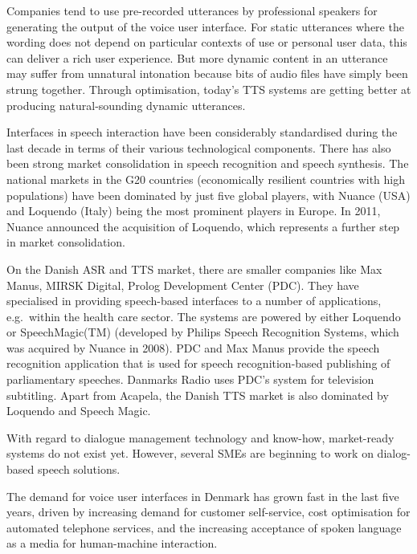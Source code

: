 \documentclass[]{../../metanetpaper}
\begin{document}
\begin{multicols}{2}

Companies tend to use pre-recorded utterances by professional speakers for generating the output of the voice user interface. For static utterances where the wording does not depend on particular contexts of use or personal user data, this can deliver a rich user experience. But more dynamic content in an utterance may suffer from unnatural intonation because bits of audio files have simply been strung together. Through optimisation, today’s TTS systems are getting better at producing natural-sounding dynamic utterances.

Interfaces in speech interaction have been considerably standardised during the last decade in terms of their various technological components. There has also been strong market consolidation in speech recognition and speech synthesis. The national markets in the G20 countries (economically resilient countries with high populations) have been dominated by just five global players, with Nuance (USA) and Loquendo (Italy) being the most prominent players in Europe. In 2011, Nuance announced the acquisition of Loquendo, which represents a further step in market consolidation.

On the Danish ASR and TTS market, there are smaller companies like Max Manus, MIRSK Digital, Prolog Development Center (PDC). They have specialised in providing speech-based interfaces to a number of applications, e.g.\ within the health care sector. The systems are powered by either Loquendo or SpeechMagic(TM) (developed by Philips Speech Recognition Systems, which was acquired by Nuance in 2008). PDC and Max Manus provide the speech recognition application that is used for speech recognition-based publishing of parliamentary speeches. Danmarks Radio uses PDC's system for television subtitling. Apart from Acapela, the Danish TTS market is also dominated by Loquendo and Speech Magic.

With regard to dialogue management technology and know-how, market-ready systems do not exist yet. However, several SMEs are beginning to work on dialog-based speech solutions.

The demand for voice user interfaces in Denmark has grown fast in the last five years, driven by increasing demand for customer self-service, cost optimisation for automated telephone services, and the increasing acceptance of spoken language as a media for human-machine interaction. 


\end{multicols}
\end{document}

